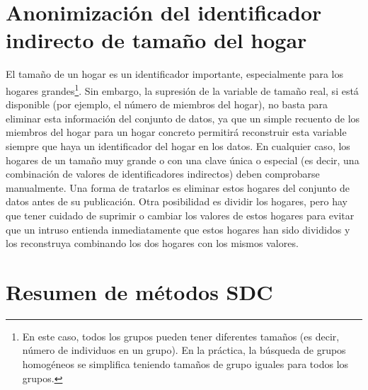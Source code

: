 \documentclass[
]{book}
\theoremstyle{definition}
\theoremstyle{definition}
\theoremstyle{definition}
\theoremstyle{definition}
\theoremstyle{remark}
\begin{document}
\hypertarget{anonimizaciuxf3n-del-identificador-indirecto-de-tamauxf1o-del-hogar}{%
\section{Anonimización del identificador indirecto de tamaño del hogar}\label{anonimizaciuxf3n-del-identificador-indirecto-de-tamauxf1o-del-hogar}}

El tamaño de un hogar es un identificador importante, especialmente para los hogares grandes\footnote{En este caso, todos los grupos pueden tener diferentes tamaños (es decir, número de individuos en un grupo). En la práctica, la búsqueda de grupos homogéneos se simplifica teniendo tamaños de grupo iguales para todos los grupos.}. Sin embargo, la supresión de la variable de tamaño real, si está disponible (por ejemplo, el número de miembros del hogar), no basta para eliminar esta información del conjunto de datos, ya que un simple recuento de los miembros del hogar para un hogar concreto permitirá reconstruir esta variable siempre que haya un identificador del hogar en los datos. En cualquier caso, los hogares de un tamaño muy grande o con una clave única o especial (es decir, una combinación de valores de identificadores indirectos) deben comprobarse manualmente. Una forma de tratarlos es eliminar estos hogares del conjunto de datos antes de su publicación. Otra posibilidad es dividir los hogares, pero hay que tener cuidado de suprimir o cambiar los valores de estos hogares para evitar que un intruso entienda inmediatamente que estos hogares han sido divididos y los reconstruya combinando los dos hogares con los mismos valores.

\hypertarget{resumen-de-muxe9todos-sdc}{%
\section{Resumen de métodos SDC}\label{resumen-de-muxe9todos-sdc}}
\end{document}
